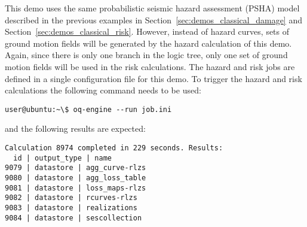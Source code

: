 This demo uses the same probabilistic seismic hazard assessment (PSHA) model
described in the previous examples in Section~\ref{sec:demos_classical_damage}
and Section~\ref{sec:demos_classical_risk}. However, instead of hazard curves,
sets of ground motion fields will be generated by the hazard calculation of
this demo. Again, since there is only one branch in the logic tree, only one
set of ground motion fields will be used in the risk calculations. The hazard
and risk jobs are defined in a single configuration file for this demo. To
trigger the hazard and risk calculations the following command needs to be
used:

\begin{verbatim}
user@ubuntu:~\$ oq-engine --run job.ini
\end{verbatim}

and the following results are expected:

\begin{verbatim}
Calculation 8974 completed in 229 seconds. Results:
  id | output_type | name
9079 | datastore | agg_curve-rlzs
9080 | datastore | agg_loss_table
9081 | datastore | loss_maps-rlzs
9082 | datastore | rcurves-rlzs
9083 | datastore | realizations
9084 | datastore | sescollection
\end{verbatim}
